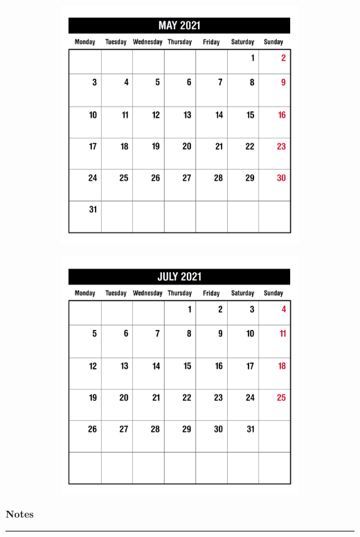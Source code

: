 \begin{figure}[H]
\begin{subfigure}[l]{0.5\textwidth}
    \includegraphics[width=\textwidth]{Sources/MonthViews/May21.jpg}
  \end{subfigure}
  \begin{subfigure}[l]{0.5\textwidth}
    \includegraphics[width=\textwidth]{Sources/MonthViews/July21.jpg}
  \end{subfigure}
\end{figure}


\newpage
\begin{notesbox}
\textbf{Notes} \\
\rule{\linewidth}{0.02cm}
\end{notesbox}